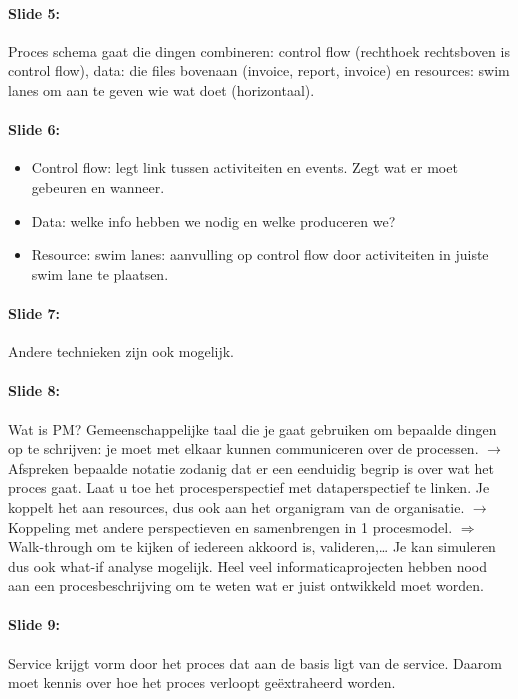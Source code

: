 \documentclass[10pt,a4paper]{report}
\begin{document}
\paragraph{Slide 5:}Proces schema gaat die dingen combineren: control flow (rechthoek rechtsboven is control flow), data: die files bovenaan (invoice, report, invoice) en resources: swim lanes om aan te geven wie wat doet (horizontaal).

\paragraph{Slide 6:}
\begin{itemize}
\item Control flow: legt link tussen activiteiten en events. Zegt wat er moet gebeuren en wanneer.
\item Data: welke info hebben we nodig en welke produceren we?
\item Resource: swim lanes: aanvulling op control flow door activiteiten in juiste swim lane te plaatsen.
\end{itemize}

\paragraph{Slide 7:}Andere technieken zijn ook mogelijk.

\paragraph{Slide 8:}Wat is PM? Gemeenschappelijke taal die je gaat gebruiken om bepaalde dingen op te schrijven: je moet met elkaar kunnen communiceren over de processen. $\rightarrow$ Afspreken bepaalde notatie zodanig dat er een eenduidig begrip is over wat het proces gaat. Laat u toe het procesperspectief met dataperspectief te linken. Je koppelt het aan resources, dus ook aan het organigram van de organisatie. $\rightarrow$ Koppeling met andere perspectieven en samenbrengen in 1 procesmodel. $\Rightarrow$ Walk-through om te kijken of iedereen akkoord is, valideren,…
Je kan simuleren dus ook what-if analyse mogelijk.
Heel veel informaticaprojecten hebben nood aan een procesbeschrijving om te weten wat er juist ontwikkeld moet worden.

\paragraph{Slide 9:}Service krijgt vorm door het proces dat aan de basis ligt van de service. Daarom moet kennis over hoe het proces verloopt ge\"extraheerd worden.
\end{document}
